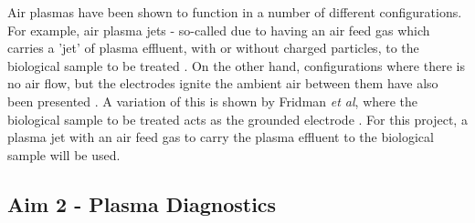 \documentclass[11pt, oneside]{article}   	%
\begin{document}
Air plasmas have been shown to function in a number of different configurations.
For example, air plasma jets - so-called due to having an air feed gas which carries a 'jet' of plasma effluent, with or without charged particles, to the biological sample to be treated \cite{Kolb2008cold, Chen2009blood}.
On the other hand, configurations where there is no air flow, but the electrodes ignite the ambient air between them have also been presented \cite{Laroussi2004evaluation}. 
A variation of this is shown by Fridman \textit{et al}, where the biological sample to be treated acts as the grounded electrode \cite{Fridman2007floating}.
For this project, a plasma jet with an air feed gas to carry the plasma effluent to the biological sample will be used.

%

\subsection*{Aim 2 - Plasma Diagnostics}
\end{document}
